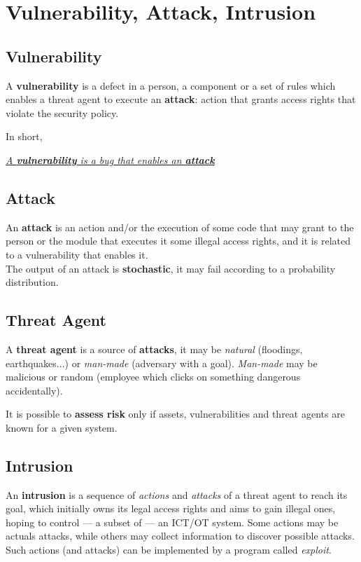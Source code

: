 \chapter{Vulnerability, Attack, Intrusion}
\section{Vulnerability}
A \textbf{vulnerability} is a defect in a person, a component or a set of rules which enables a threat agent to execute an \textbf{attack}:
action that grants access rights that violate the security policy.

In short,
\begin{center}
    \textit{\ul{A \textbf{vulnerability} is a bug that enables an \textbf{attack}}}
\end{center}


\section{Attack}
An \textbf{attack} is an action and/or the execution of some code that may grant to the person or the module that executes it some illegal access rights, and it is related to a vulnerability that enables it.\\
The output of an attack is \textbf{stochastic}, it may fail according to a probability distribution.


\section{Threat Agent}
A \textbf{threat agent} is a source of \textbf{attacks},
it may be \textit{natural} (floodings, earthquakes...) or \textit{man-made }(adversary with a goal).
\textit{Man-made} may be malicious or random (employee which clicks on something dangerous accidentally).

\begin{center}
    It is possible to \textbf{assess risk} only if assets, vulnerabilities and threat agents are known for a given system. 
\end{center}

\section{Intrusion}
An \textbf{intrusion} is a sequence of \textit{actions} and \textit{attacks} of a threat agent to reach its goal,
which initially owns its legal access rights and aims to gain illegal ones,
hoping to control {---} a subset of {---} an ICT/OT system.
Some actions may be actuals attacks, while others may collect information to discover possible attacks.
Such actions (and attacks) can be implemented by a program called \textit{exploit}.

